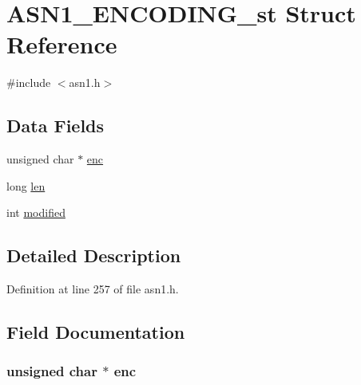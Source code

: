 \hypertarget{struct_a_s_n1___e_n_c_o_d_i_n_g__st}{}\section{A\+S\+N1\+\_\+\+E\+N\+C\+O\+D\+I\+N\+G\+\_\+st Struct Reference}
\label{struct_a_s_n1___e_n_c_o_d_i_n_g__st}


{\ttfamily \#include $<$asn1.\+h$>$}

\subsection*{Data Fields}
\begin{DoxyCompactItemize}
\item 
unsigned char $\ast$ \hyperlink{struct_a_s_n1___e_n_c_o_d_i_n_g__st_a49c6552b6da306260992701b4d848791}{enc}
\item 
long \hyperlink{struct_a_s_n1___e_n_c_o_d_i_n_g__st_aaccba9d5adc3f6c39aad767db95ba484}{len}
\item 
int \hyperlink{struct_a_s_n1___e_n_c_o_d_i_n_g__st_a0826efcc81bba9d934e1207721a46ddf}{modified}
\end{DoxyCompactItemize}


\subsection{Detailed Description}


Definition at line 257 of file asn1.\+h.



\subsection{Field Documentation}
\subsubsection[{\texorpdfstring{enc}{enc}}]{\setlength{\rightskip}{0pt plus 5cm}unsigned char $\ast$ enc}\hypertarget{struct_a_s_n1___e_n_c_o_d_i_n_g__st_a49c6552b6da306260992701b4d848791}{}\label{struct_a_s_n1___e_n_c_o_d_i_n_g__st_a49c6552b6da306260992701b4d848791}


